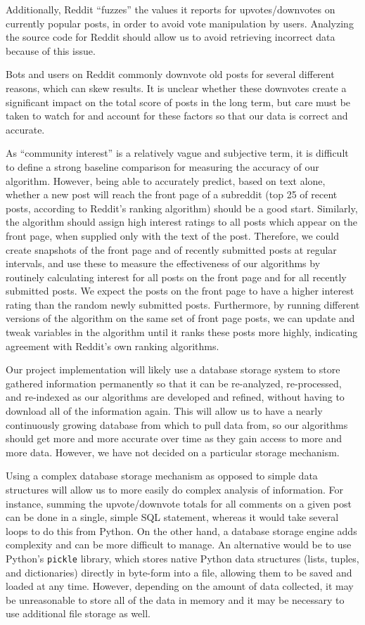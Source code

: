 \documentclass{acm_proc_article-sp}
\begin{document}
Additionally, Reddit ``fuzzes'' the values it reports for upvotes/downvotes on currently popular posts, in
order to avoid vote manipulation by users.  Analyzing the source code for Reddit should allow us to
avoid retrieving incorrect data because of this issue.

Bots and users on Reddit commonly downvote old posts for several different reasons, which can skew
results.  It is unclear whether these downvotes create a significant impact on the total score of
posts in the long term, but care must be taken to watch for and account for these factors so that
our data is correct and accurate.

As ``community interest'' is a relatively vague and subjective term, it is difficult to define a strong
baseline comparison for measuring the accuracy of our algorithm.
However, being able to accurately predict, based on text alone, whether a new post will reach the front
page of a subreddit (top 25 of recent posts, according to Reddit's ranking algorithm) should be a good
start.  Similarly, the algorithm should assign high interest ratings to all posts which appear on
the front page, when supplied only with the text of the post.  Therefore, we could create snapshots
of the front page and of recently submitted posts at regular intervals, and use these to measure
the effectiveness of our algorithms by routinely calculating interest for all posts on the front page
and for all recently submitted posts.  We expect the posts on the front page to have a higher interest
rating than the random newly submitted posts.  Furthermore, by running different versions of the algorithm
on the same set of front page posts, we can update and tweak variables in the algorithm until it ranks these
posts more highly, indicating agreement with Reddit's own ranking algorithms.

Our project implementation will likely use a database storage system to store
gathered information permanently so that it can be re-analyzed, re-processed, and re-indexed as
our algorithms are developed and refined, without having to download all of the information again.
This will allow us to have a nearly continuously growing database from which to pull data from, so
our algorithms should get more and more accurate over time as they gain access to more and more
data.  However, we have not decided on a particular storage mechanism.

Using a complex database storage mechanism as opposed to simple data structures will allow us to more
easily do complex analysis of information.  For instance, summing the upvote/downvote totals for all
comments on a given post can be done in a single, simple SQL statement, whereas it would take several
loops to do this from Python.  On the other hand, a database storage engine adds complexity and can
be more difficult to manage.  An alternative would be to use Python's \texttt{pickle} library, which
stores native Python data structures (lists, tuples, and dictionaries) directly in byte-form into a file,
allowing them to be saved and loaded at any time.  However, depending on the amount of data collected,
it may be unreasonable to store all of the data in memory and it may be necessary to use additional file
storage as well.
\end{document}
